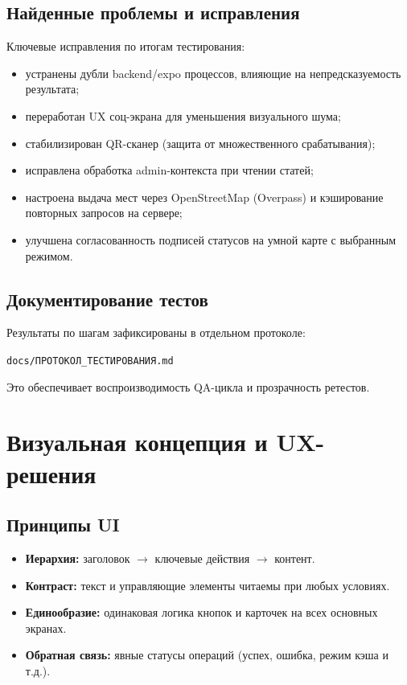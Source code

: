 \documentclass[12pt,a4paper]{article}
\newcommand{\code}[1]{{\small\texttt{#1}}}
\begin{document}
\subsection{Найденные проблемы и исправления}

Ключевые исправления по итогам тестирования:
\begin{itemize}
  \item устранены дубли backend/expo процессов, влияющие на непредсказуемость результата;
  \item переработан UX соц-экрана для уменьшения визуального шума;
  \item стабилизирован QR-сканер (защита от множественного срабатывания);
  \item исправлена обработка admin-контекста при чтении статей;
  \item настроена выдача мест через OpenStreetMap (Overpass) и кэширование повторных запросов на сервере;
  \item улучшена согласованность подписей статусов на умной карте с выбранным режимом.
\end{itemize}

\subsection{Документирование тестов}

Результаты по шагам зафиксированы в отдельном протоколе:
\begin{center}
\code{docs/ПРОТОКОЛ\_ТЕСТИРОВАНИЯ.md}
\end{center}
Это обеспечивает воспроизводимость QA-цикла и прозрачность ретестов.

\section{Визуальная концепция и UX-решения}

\subsection{Принципы UI}

\begin{itemize}
  \item \textbf{Иерархия:} заголовок $\rightarrow$ ключевые действия $\rightarrow$ контент.
  \item \textbf{Контраст:} текст и управляющие элементы читаемы при любых условиях.
  \item \textbf{Единообразие:} одинаковая логика кнопок и карточек на всех основных экранах.
  \item \textbf{Обратная связь:} явные статусы операций (успех, ошибка, режим кэша и т.д.).
\end{itemize}
\end{document}
